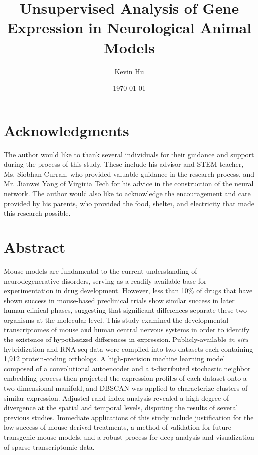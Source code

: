 \documentclass[12pt,oneside,onecolumn,a4paper]{article}
\title{\vspace{6cm}Unsupervised Analysis of Gene Expression in Neurological Animal Models}
\author{Kevin Hu}
\affil{Massachusetts Academy of Math and Science at WPI\vspace{-0.4cm}}
\date{\today}
\begin{document}
\maketitle
\thispagestyle{empty}

\clearpage

\break
\tableofcontents
\break

\section*{Acknowledgments}

The author would like to thank several individuals for their guidance and support during the process of this study. These include his advisor and STEM teacher, Ms. Siobhan Curran, who provided valuable guidance in the research process, and Mr. Jianwei Yang of Virginia Tech for his advice in the construction of the neural network. The author would also like to acknowledge the encouragement and care provided by his parents, who provided the food, shelter, and electricity that made this research possible.

\break

\section{Abstract}

Mouse models are fundamental to the current understanding of neurodegenerative disorders, serving as a readily available base for experimentation in drug development. However, less than 10\% of drugs that have shown success in mouse-based preclinical trials show similar success in later human clinical phases, suggesting that significant differences separate these two organisms at the molecular level. This study examined the developmental transcriptomes of mouse and human central nervous systems in order to identify the existence of hypothesized differences in expression. Publicly-available \textit{in situ} hybridization and RNA-seq data were compiled into two datasets each containing 1,912 protein-coding orthologs. A high-precision machine learning model composed of a convolutional autoencoder and a t-distributed stochastic neighbor embedding process then projected the expression profiles of each dataset onto a two-dimensional manifold, and DBSCAN was applied to characterize clusters of similar expression. Adjusted rand index analysis revealed a high degree of divergence at the spatial and temporal levels, disputing the results of several previous studies. Immediate applications of this study include justification for the low success of mouse-derived treatments, a method of validation for future transgenic mouse models, and a robust process for deep analysis and visualization of sparse transcriptomic data.
\end{document}
